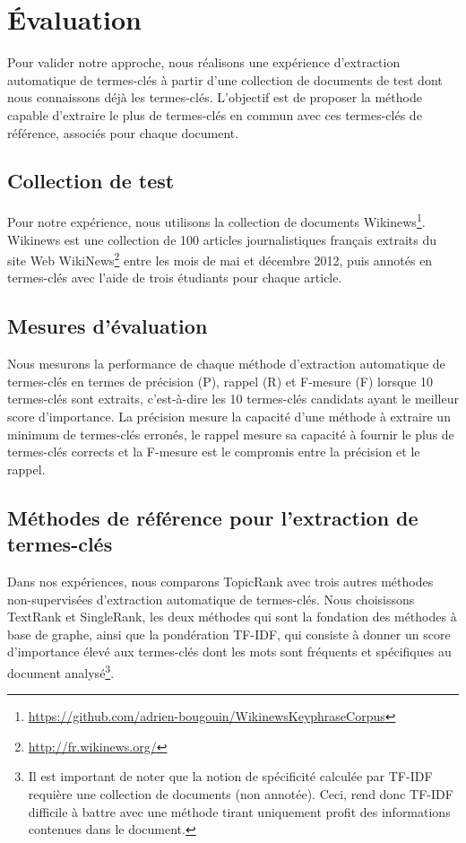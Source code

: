 \section{Évaluation}
\label{sec:evaluation}
  Pour valider notre approche, nous réalisons une expérience d'extraction
  automatique de termes-clés à partir d'une collection de documents de test dont
  nous connaissons déjà les termes-clés. L'objectif est de proposer la méthode
  capable d'extraire le plus de termes-clés en commun avec ces termes-clés de
  référence, associés pour chaque document.

  \subsection{Collection de test}
  \label{subsec:donnees_de_test}
    Pour notre expérience, nous utilisons la collection de documents
    Wikinews\footnote{\url{https://github.com/adrien-bougouin/WikinewsKeyphraseCorpus}}.
    Wikinews est une collection de 100 articles journalistiques français
    extraits du site Web WikiNews\footnote{\url{http://fr.wikinews.org/}} entre
    les mois de mai et décembre 2012, puis annotés en termes-clés avec l'aide de
    trois étudiants pour chaque article.

  \subsection{Mesures d'évaluation}
  \label{subsec:mesures_d_evaluation}
    Nous mesurons la performance de chaque méthode d'extraction automatique de
    termes-clés en termes de précision (P), rappel (R) et F-mesure (F) lorsque
    10 termes-clés sont extraits, c'est-à-dire les 10 termes-clés candidats
    ayant le meilleur score d'importance. La précision mesure la capacité d'une
    méthode à extraire un minimum de termes-clés erronés, le rappel mesure sa
    capacité à fournir le plus de termes-clés corrects et la F-mesure est le
    compromis entre la précision et le rappel.

  \subsection{Méthodes de référence pour l'extraction de termes-clés}
  \label{subsec:systemes_de_reference_pour_l_extraction_de_termes_cles}
    Dans nos expériences, nous comparons TopicRank avec trois autres
    méthodes non-supervisées d'extraction automatique de termes-clés. Nous
    choisissons TextRank et SingleRank, les deux méthodes qui sont la
    fondation des méthodes à base de graphe, ainsi que la pondération TF-IDF,
    qui consiste à donner un score d'importance élevé aux termes-clés dont les
    mots sont fréquents et spécifiques au document analysé\footnote{Il est
    important de noter que la notion de spécificité calculée par TF-IDF requière
    une collection de documents (non annotée). Ceci, rend donc TF-IDF difficile
    à battre avec une méthode tirant uniquement profit des informations
    contenues dans le document.}.

